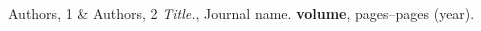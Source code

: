 \documentclass[12pt,a4paper]{article}
\begin{document}











\begin{thebibliography}{99}

Authors, 1 \& Authors, 2 
\textit{Title.},
Journal name. \textbf{volume}, pages--pages (year).


 \end{thebibliography}
\end{document}
